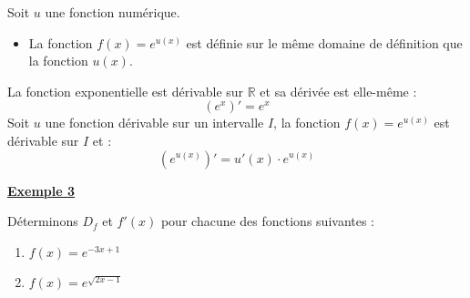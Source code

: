 \documentclass[12pt,a4paper]{article}
\begin{document}
\begin{tcolorbox}[colback=gray!5!white,colframe=black,title=\textbf{Règle pour le domaine de définition}]
Soit $u$ une fonction numérique.
\begin{itemize}
    \item La fonction $f(x) = e^{u(x)}$ est définie sur le même domaine de définition que la fonction $u(x)$.
\end{itemize}
\end{tcolorbox}

\begin{tcolorbox}[colback=blue!5!white,colframe=myblue,title=\textbf{Formules de dérivation}]
La fonction exponentielle est dérivable sur $\mathbb{R}$ et sa dérivée est elle-même :
\[
(e^x)' = e^x
\]
Soit $u$ une fonction dérivable sur un intervalle $I$, la fonction $f(x) = e^{u(x)}$ est dérivable sur $I$ et :
\[
(e^{u(x)})' = u'(x) \cdot e^{u(x)}
\]
\end{tcolorbox}

\underline{\textbf{Exemple 3}}

\vspace{0.3cm}

Déterminons $D_f$ et $f'(x)$ pour chacune des fonctions suivantes :

\begin{enumerate}
    \item $f(x) = e^{-3x + 1}$
    
    \dotfill
    
    \dotfill
    
    \dotfill
    
    \item $f(x) = e^{\sqrt{2x - 1}}$
    
    \dotfill
    
    \dotfill
\end{enumerate}
\end{document}
